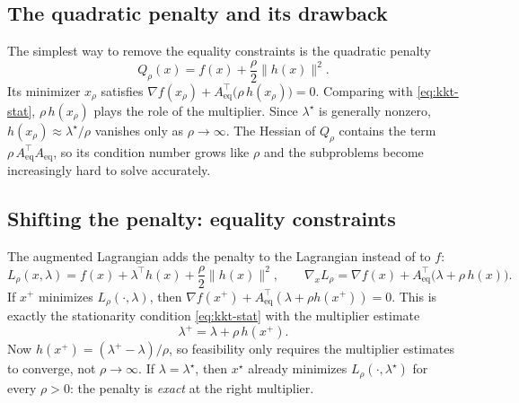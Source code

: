 \documentclass[11pt,a4paper]{article}
\newcommand{\Aeq}{A_{\mathrm{eq}}}
\newcommand{\norm}[1]{\lVert #1\rVert}
\begin{document}
\subsection{The quadratic penalty and its drawback}
The simplest way to remove the equality constraints is the quadratic penalty
\[
  Q_\rho(x) = f(x) + \frac{\rho}{2}\norm{h(x)}^2 .
\]
Its minimizer $x_\rho$ satisfies $\nabla f(x_\rho) + \Aeq^\top\big(\rho\,h(x_\rho)\big) = 0$.
Comparing with \eqref{eq:kkt-stat}, $\rho\,h(x_\rho)$ plays the role of the
multiplier. Since $\lambda^\star$ is generally nonzero, $h(x_\rho)\approx\lambda^\star/\rho$
vanishes only as $\rho\to\infty$. The Hessian of $Q_\rho$ contains the term
$\rho\,\Aeq^\top\Aeq$, so its condition number grows like $\rho$ and the
subproblems become increasingly hard to solve accurately.

\subsection{Shifting the penalty: equality constraints}
The augmented Lagrangian adds the penalty to the Lagrangian instead of to $f$:
\begin{equation}\label{eq:al-eq}
  L_\rho(x,\lambda) = f(x) + \lambda^\top h(x) + \frac{\rho}{2}\norm{h(x)}^2 ,
  \qquad
  \nabla_x L_\rho = \nabla f(x) + \Aeq^\top\big(\lambda + \rho\,h(x)\big).
\end{equation}
If $x^+$ minimizes $L_\rho(\cdot,\lambda)$, then
$\nabla f(x^+) + \Aeq^\top(\lambda+\rho h(x^+)) = 0$. This is exactly the
stationarity condition \eqref{eq:kkt-stat} with the multiplier estimate
\begin{equation}\label{eq:update-eq}
  \lambda^+ = \lambda + \rho\, h(x^+).
\end{equation}
Now $h(x^+) = (\lambda^+-\lambda)/\rho$, so feasibility only requires the
multiplier estimates to converge, not $\rho\to\infty$. If $\lambda=\lambda^\star$,
then $x^\star$ already minimizes $L_\rho(\cdot,\lambda^\star)$ for every
$\rho>0$: the penalty is \emph{exact} at the right multiplier.
\end{document}

